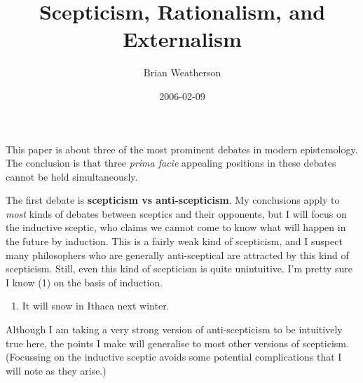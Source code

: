 \documentclass[
  11pt,
  letterpaper,
  DIV=11,
  numbers=noendperiod,
  oneside]{scrartcl}
\title{Scepticism, Rationalism, and Externalism}
\author{Brian Weatherson}
\date{2006-02-09}
\providecommand{\tightlist}{%
  \setlength{\itemsep}{0pt}\setlength{\parskip}{0pt}}\usepackage{longtable,booktabs,array}
\begin{document}
\maketitle
This paper is about three of the most prominent debates in modern
epistemology. The conclusion is that three \emph{prima facie} appealing
positions in these debates cannot be held simultaneously.


The first debate is \textbf{scepticism vs anti-scepticism}. My
conclusions apply to \emph{most} kinds of debates between sceptics and
their opponents, but I will focus on the inductive sceptic, who claims
we cannot come to know what will happen in the future by induction. This
is a fairly weak kind of scepticism, and I suspect many philosophers who
are generally anti-sceptical are attracted by this kind of scepticism.
Still, even this kind of scepticism is quite unintuitive. I'm pretty
sure I know (1) on the basis of induction.


\begin{enumerate}
\def\labelenumi{\arabic{enumi}.}
\tightlist
\item
  It will snow in Ithaca next winter.
\end{enumerate}

Although I am taking a very strong version of anti-scepticism to be
intuitively true here, the points I make will generalise to most other
versions of scepticism. (Focussing on the inductive sceptic avoids some
potential complications that I will note as they arise.)

\end{document}
